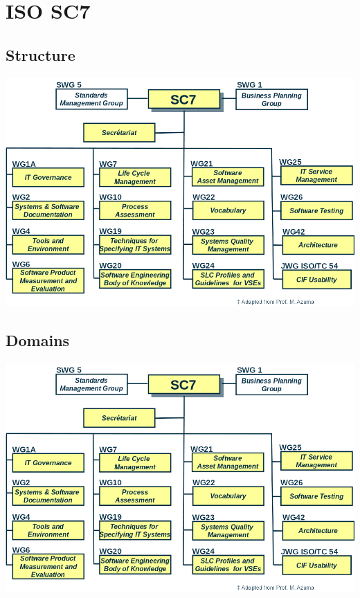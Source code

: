 \documentclass{article}[18pt]
\begin{document}
\section{ISO SC7}
\subsection{Structure}
\begin{center}
	\includegraphics[scale=0.7]{SC7}
\end{center}
\subsection{Domains}
\begin{center}
	\includegraphics[scale=0.7]{Domains}
\end{center}
\end{document}
